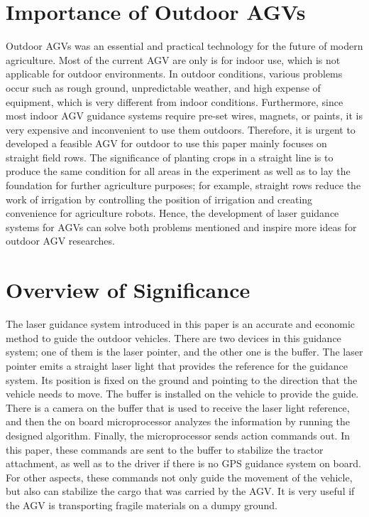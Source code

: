 \documentclass[letterpaper,12pt,oneside]{book}
\begin{document}
		
		\section{Importance of Outdoor AGVs}
		Outdoor AGVs was an essential and practical technology for the future of modern agriculture. Most of the current AGV are only is for indoor use, which is not applicable for outdoor environments. In outdoor conditions, various problems occur such as rough ground, unpredictable weather, and high expense of equipment, which is very different from indoor conditions. Furthermore, since most indoor AGV guidance systems require pre-set wires, magnets, or paints, it is very expensive and inconvenient to use them outdoors. Therefore, it is urgent to developed a feasible AGV for outdoor to use this paper mainly focuses on straight field rows. The significance of planting crops in a straight line is to produce the same condition for all areas in the experiment as well as to lay the foundation for further agriculture purposes; for example, straight rows reduce the work of irrigation by controlling the position of irrigation and creating convenience for agriculture robots. Hence, the development of laser guidance systems for AGVs can solve both problems mentioned and inspire more ideas for outdoor AGV researches.
		
		\section{Overview of Significance}
		The laser guidance system introduced in this paper is an accurate and economic method to guide the outdoor vehicles. There are two devices in this guidance system; one of them is the laser pointer, and the other one is the buffer. The laser pointer emits a straight laser light that provides the reference for the guidance system. Its position is fixed on the ground and pointing to the direction that the vehicle needs to move. The buffer is installed on the vehicle to provide the guide. There is a camera on the buffer that is used to receive the laser light reference, and then the on board microprocessor analyzes the information by running the designed algorithm. Finally, the microprocessor sends action commands out. In this paper, these commands are sent to the buffer to stabilize the tractor attachment, as well as to the driver if there is no GPS guidance system on board. For other aspects, these commands not only guide the movement of the vehicle, but also can stabilize the cargo that was carried by the AGV. It is very useful if the AGV is transporting fragile materials on a dumpy ground.
		
\end{document}
